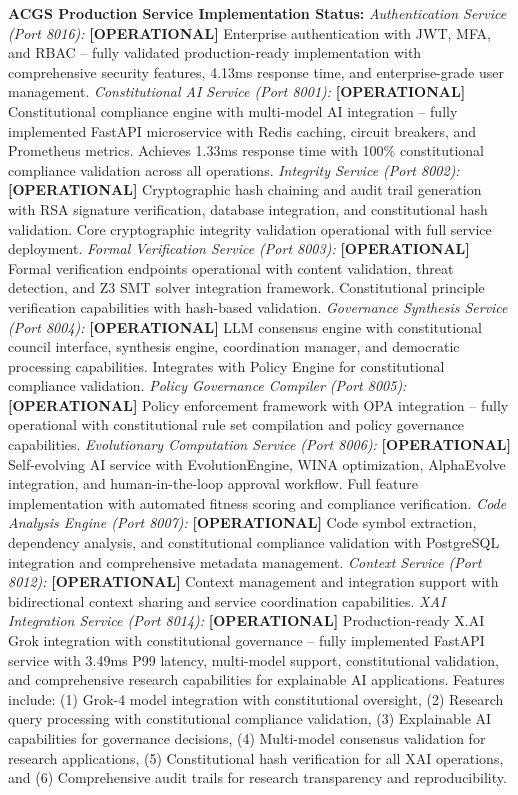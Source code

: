 \documentclass[manuscript,screen,9pt]{acmart}
\begin{document}
\textbf{ACGS Production Service Implementation Status:}
\textit{Authentication Service (Port 8016):} \textbf{[OPERATIONAL]} Enterprise authentication with JWT, MFA, and RBAC -- fully validated production-ready implementation with comprehensive security features, 4.13ms response time, and enterprise-grade user management.
\textit{Constitutional AI Service (Port 8001):} \textbf{[OPERATIONAL]} Constitutional compliance engine with multi-model AI integration -- fully implemented FastAPI microservice with Redis caching, circuit breakers, and Prometheus metrics. Achieves 1.33ms response time with 100\% constitutional compliance validation across all operations.
\textit{Integrity Service (Port 8002):} \textbf{[OPERATIONAL]} Cryptographic hash chaining and audit trail generation with RSA signature verification, database integration, and constitutional hash validation. Core cryptographic integrity validation operational with full service deployment.
\textit{Formal Verification Service (Port 8003):} \textbf{[OPERATIONAL]} Formal verification endpoints operational with content validation, threat detection, and Z3 SMT solver integration framework. Constitutional principle verification capabilities with hash-based validation.
\textit{Governance Synthesis Service (Port 8004):} \textbf{[OPERATIONAL]} LLM consensus engine with constitutional council interface, synthesis engine, coordination manager, and democratic processing capabilities. Integrates with Policy Engine for constitutional compliance validation.
\textit{Policy Governance Compiler (Port 8005):} \textbf{[OPERATIONAL]} Policy enforcement framework with OPA integration -- fully operational with constitutional rule set compilation and policy governance capabilities.
\textit{Evolutionary Computation Service (Port 8006):} \textbf{[OPERATIONAL]} Self-evolving AI service with EvolutionEngine, WINA optimization, AlphaEvolve integration, and human-in-the-loop approval workflow. Full feature implementation with automated fitness scoring and compliance verification.
\textit{Code Analysis Engine (Port 8007):} \textbf{[OPERATIONAL]} Code symbol extraction, dependency analysis, and constitutional compliance validation with PostgreSQL integration and comprehensive metadata management.
\textit{Context Service (Port 8012):} \textbf{[OPERATIONAL]} Context management and integration support with bidirectional context sharing and service coordination capabilities.
\textit{XAI Integration Service (Port 8014):} \textbf{[OPERATIONAL]} Production-ready X.AI Grok integration with constitutional governance -- fully implemented FastAPI service with 3.49ms P99 latency, multi-model support, constitutional validation, and comprehensive research capabilities for explainable AI applications. Features include: (1) Grok-4 model integration with constitutional oversight, (2) Research query processing with constitutional compliance validation, (3) Explainable AI capabilities for governance decisions, (4) Multi-model consensus validation for research applications, (5) Constitutional hash verification for all XAI operations, and (6) Comprehensive audit trails for research transparency and reproducibility.
\end{document}
